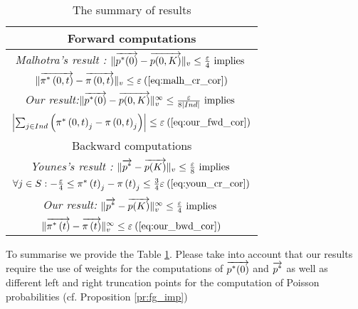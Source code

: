 \documentclass[times, 10pt,twocolumn]{article}
\begin{document}
		{\small
		\begin{table}
			\caption{The summary of results}
			\label{tbl:summ}
			\begin{center}
				\begin{tabular}{|l|c|}
					\hline
					\multicolumn{2}{|c|}{Forward computations} \\
					\hline
					\multicolumn{2}{|c|}{\emph{Malhotra's result \cite{MalhotraMT_MR94}:}  $\lVert \overrightarrow{p^{*}(0)} - \overrightarrow{p(0,K)} \rVert_{v} \leq \frac{\varepsilon}{4} \text{ implies }$}\\
					\multicolumn{2}{|c|}{$\lVert \overrightarrow{\pi^{*} \left(0, t \right )} - \overrightarrow{\pi \left(0, t \right )} \rVert_{v} \leq \varepsilon \: (\ref{eq:malh_cr_cor})$ } \\
					\hline
					\multicolumn{2}{|c|}{\emph{Our result:}$\lVert  \overrightarrow{p^{*}(0)} - \overrightarrow{p(0,K)}  \rVert_{v}^{\infty} \leq \frac{\varepsilon}{8 |Ind|} \text{ implies }$}\\
					\multicolumn{2}{|c|}{$\left| \sum_{j \in Ind} \left( \pi^{*} \left(0, t \right )_{j} - \pi \left(0, t \right )_{j} \right) \right| \leq \varepsilon \: (\ref{eq:our_fwd_cor})$}\\
					\hline
					\multicolumn{2}{|c|}{Backward computations} \\
					\hline
					\multicolumn{2}{|c|}{\emph{Younes's result \cite{YounesKNP_STTT05}:} $\lVert \overrightarrow{p^{*}} - \overrightarrow{p(K)} \rVert_{v} \leq \frac{\varepsilon}{8} \text{ implies }$}\\
					\multicolumn{2}{|c|}{$\forall j \in S : -\frac{\varepsilon}{4} \leq \pi^{*} \left( t \right)_{j} - \pi \left( t \right)_{j} \leq \frac{3}{4}\varepsilon \: (\ref{eq:youn_cr_cor})$}\\
					\hline
					\multicolumn{2}{|c|}{\emph{Our result:} $\lVert  \overrightarrow{p^{*}} - \overrightarrow{p(K)}  \rVert_{v}^{\infty} \leq \frac{\varepsilon}{4} \text{ implies }$}\\
					\multicolumn{2}{|c|}{$\lVert  \overrightarrow{\pi^{*} \left( t \right)} - \overrightarrow{\pi \left( t \right) }  \rVert_{v}^{\infty}\leq \varepsilon \: (\ref{eq:our_bwd_cor})$}\\
					\hline
				\end{tabular}
			\end{center}
			\vspace{-0.7cm}
		\end{table}
		}
		To summarise we provide the Table \ref{tbl:summ}. Please take into account that our results require the use of weights for the computations of $\overrightarrow{p^{*}(0)}$ and $\overrightarrow{p^{*}}$ as well as different left and right truncation points for the computation of Poisson probabilities (cf. Proposition \ref{pr:fg_imp})
		
\end{document}
